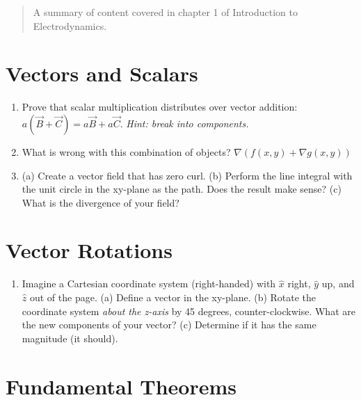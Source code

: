 \documentclass[10pt]{article}
\begin{document}
\maketitle

\begin{abstract}
A summary of content covered in chapter 1 of Introduction to Electrodynamics. 
\end{abstract}
\noindent

\section{Vectors and Scalars}

\begin{enumerate}
\item Prove that scalar multiplication distributes over vector addition: $a(\vec{B} + \vec{C}) = a\vec{B} + a\vec{C}$.  \textit{Hint: break into components.} \\ \vspace{1cm}
\item What is wrong with this combination of objects?  $\nabla(f(x,y) + \nabla g(x,y))$ \\ \vspace{1cm}
\item (a) Create a vector field that has zero curl.  (b) Perform the line integral with the unit circle in the xy-plane as the path.  Does the result make sense? (c) What is the divergence of your field? \\ \vspace{2.5cm}
\end{enumerate}

\section{Vector Rotations}

\begin{enumerate}
\item Imagine a Cartesian coordinate system (right-handed) with $\hat{x}$ right, $\hat{y}$ up, and $\hat{z}$ out of the page. (a) Define a vector in the xy-plane.  (b) Rotate the coordinate system \textit{about the z-axis} by 45 degrees, counter-clockwise.  What are the new components of your vector?  (c) Determine if it has the same magnitude (it should). \\ \vspace{3cm}
\end{enumerate}

\section{Fundamental Theorems}
\end{document}
